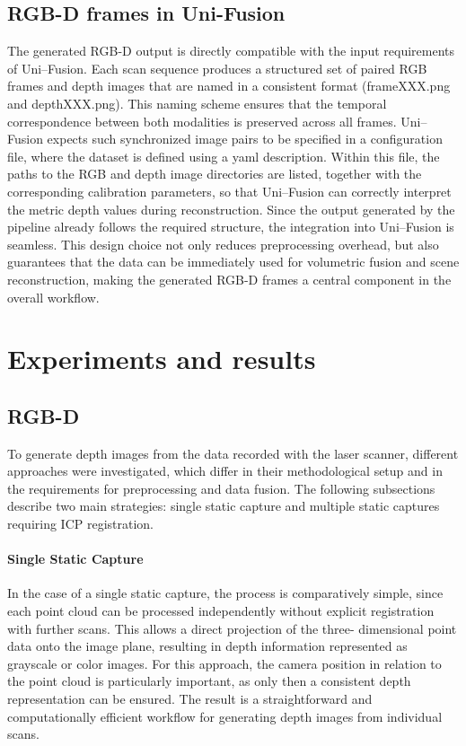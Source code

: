 \documentclass[english, bachelor, utf8]{base/thesis_telematics}
\begin{document}
\section*{RGB-D frames in Uni-Fusion}  
The generated RGB-D output is directly compatible with the input requirements of Uni--Fusion. Each 
scan sequence produces a structured set of paired RGB frames and depth images that are named in a 
consistent format (frameXXX.png and depthXXX.png). This naming scheme ensures 
that the temporal correspondence between both modalities is preserved across all frames. Uni--Fusion 
expects such synchronized image pairs to be specified in a configuration file, where the dataset is 
defined using a yaml description. Within this file, the paths to the RGB and depth image 
directories are listed, together with the corresponding calibration parameters, so that Uni--Fusion 
can correctly interpret the metric depth values during reconstruction. Since the output generated 
by the pipeline already follows the required structure, the integration into Uni--Fusion is seamless. 
This design choice not only reduces preprocessing overhead, but also guarantees that the data can be 
immediately used for volumetric fusion and scene reconstruction, making the generated RGB-D frames 
a central component in the overall workflow.

\chapter{Experiments and results}
\label{sec:experiments}
\section{RGB-D}

To generate depth images from the data recorded with the laser scanner, different approaches were investigated, 
which differ in their methodological setup and in the requirements for preprocessing and data fusion. The following 
subsections describe two main strategies: single static capture and multiple static captures requiring ICP 
registration.

\subsubsection*{Single Static Capture}
In the case of a single static capture, the process is comparatively simple, since each point cloud can be processed 
independently without explicit registration with further scans. This allows a direct projection of the three-
dimensional point data onto the image plane, resulting in depth information represented as grayscale or color images. 
For this approach, the camera position in relation to the point cloud is particularly important, as only then a 
consistent depth representation can be ensured. The result is a straightforward and computationally efficient 
workflow for generating depth images from individual scans.
\end{document}
